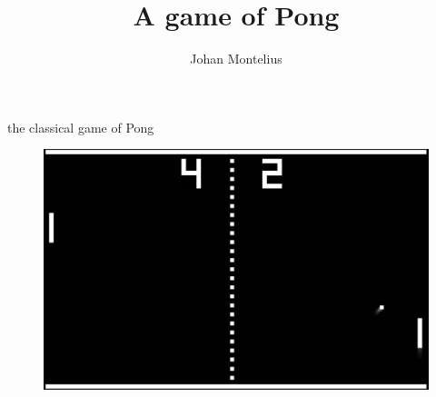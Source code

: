 

\usepackage{pgf-umlsd}
\usetikzlibrary{fit, positioning}

\title[ID1019 A game of Pong]{A game of Pong}


\author{Johan Montelius}
\date{\semester}



\begin{frame}
\titlepage
\end{frame}

\begin{frame}{the classical game of Pong}

  \begin{figure}
    \includegraphics[scale=0.1]{pong.png}
  \end{figure}
  
\end{frame}

